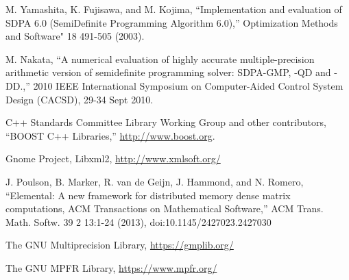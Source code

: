 \documentclass[12pt]{article}
\numberwithin{equation}{section}
\begin{document}
\begin{thebibliography}{9}
  M. Yamashita, K. Fujisawa, and M. Kojima,
  ``Implementation and evaluation of SDPA 6.0 (SemiDefinite Programming Algorithm 6.0),''
  Optimization Methods and Software" 18 491-505 (2003).

  M. Nakata,
  ``A numerical evaluation of highly accurate multiple-precision arithmetic version of semidefinite programming solver: SDPA-GMP, -QD and -DD.,''
  2010 IEEE International Symposium on Computer-Aided Control System Design (CACSD), 29-34 Sept 2010.

  C++ Standards Committee Library Working Group and other contributors,
  ``BOOST C++ Libraries,''
  \href{http://www.boost.org}{http://www.boost.org}.

  Gnome Project,
  Libxml2,
  \href{http://www.xmlsoft.org/}{http://www.xmlsoft.org/}

  J. Poulson, B. Marker, R. van de Geijn, J. Hammond, and N. Romero,
  ``Elemental: A new framework for distributed memory dense matrix computations, ACM Transactions on Mathematical Software,''
  ACM Trans. Math. Softw. 39 2 13:1-24 (2013),
  doi:10.1145/2427023.2427030
  
  The GNU Multiprecision Library,
  \href{https://gmplib.org/}{https://gmplib.org/}

  The GNU MPFR Library,
  \href{https://www.mpfr.org/}{https://www.mpfr.org/}

\end{thebibliography}
\end{document}
